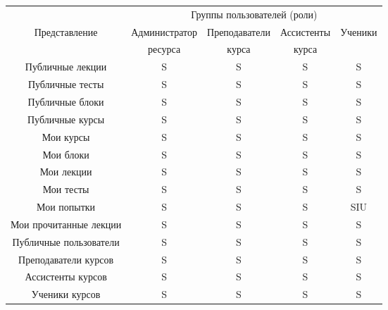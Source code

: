 \documentclass[a4paper,14pt]{article}
\begin{document}
\begin{table}[H]
	\begin{flushleft} 
	\end{flushleft}
	\begin{adjustbox}{width=\linewidth}
	\begin{tabular}{|c|c|c|c|c|}
		\hline
		                       &   \multicolumn{4}{c|}{Группы пользователей (роли)}   \\ \cline{2-5}
		    Представление      & Администратор & Преподаватели & Ассистенты & Ученики \\
		                       &    ресурса    &     курса     &   курса    &         \\ \hline
		   Публичные лекции    &       S       &       S       &     S      &    S    \\ \hline
		   Публичные тесты     &       S       &       S       &     S      &    S    \\ \hline
		   Публичные блоки     &       S       &       S       &     S      &    S    \\ \hline
		   Публичные курсы     &       S       &       S       &     S      &    S    \\ \hline
		      Мои курсы        &       S       &       S       &     S      &    S    \\ \hline
		      Мои блоки        &       S       &       S       &     S      &    S    \\ \hline
		      Мои лекции       &       S       &       S       &     S      &    S    \\ \hline
		      Мои тесты        &       S       &       S       &     S      &    S    \\ \hline
		     Мои попытки       &       S       &       S       &     S      &   SIU   \\ \hline
		Мои прочитанные лекции &       S       &       S       &     S      &    S    \\ \hline
		Публичные пользователи &       S       &       S       &     S      &    S    \\ \hline
		 Преподаватели курсов  &       S       &       S       &     S      &    S    \\ \hline
		  Ассистенты курсов    &       S       &       S       &     S      &    S    \\ \hline
		    Ученики курсов     &       S       &       S       &     S      &    S    \\ \hline
	\end{tabular}
	\end{adjustbox}
\end{table}
\end{document}
